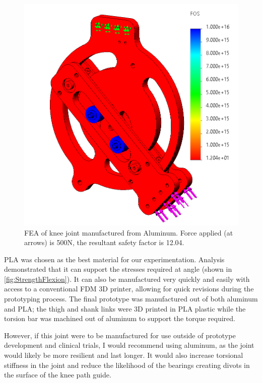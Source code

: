 \begin{figure}[ht!]
    \centering
    \includegraphics[width=0.8\linewidth]{Figures/Design/FEA_AL_45deg.png}
    \caption{FEA of knee joint manufactured from Aluminum. Force applied (at arrows) is 500N, the resultant safety factor is 12.04.}
    \label{fig:FEA_AL}
\end{figure}

PLA was chosen as the best material for our experimentation. Analysis demonstrated that it can support the stresses required at angle (shown in \autoref{fig:StrengthFlexion}). It can also be manufactured very quickly and easily with access to a conventional FDM 3D printer, allowing for quick revisions during the prototyping process. The final prototype was manufactured out of both aluminum and PLA; the thigh and shank links were 3D printed in PLA plastic while the torsion bar was machined out of aluminum to support the torque required.

However, if this joint were to be manufactured for use outside of prototype development and clinical trials, I would recommend using aluminum, as the joint would likely be more resilient and last longer. It would also increase torsional stiffness in the joint and reduce the likelihood of the bearings creating divots in the surface of the knee path guide.


